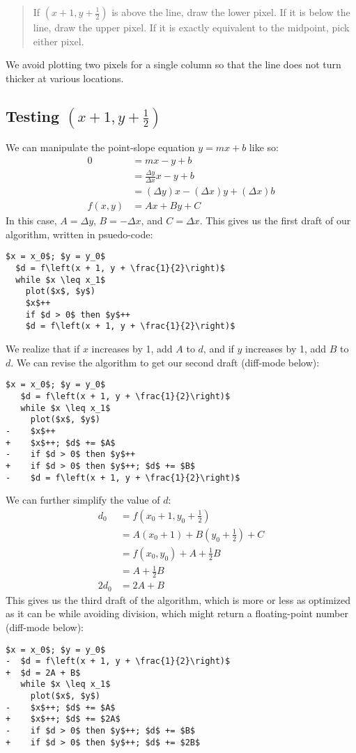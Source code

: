 \documentclass[12pt,letterpaper]{article}
\begin{document}
\begin{quote}
  If $\left(x + 1, y + \frac{1}{2}\right)$ is above the line, draw the lower pixel.
  If it is below the line, draw the upper pixel.
  If it is exactly equivalent to the midpoint, pick either pixel.
\end{quote}

We avoid plotting two pixels for a single column so that the line does not turn thicker at various locations.

\subsection{Testing $\left(x + 1, y + \frac{1}{2}\right)$}
We can manipulate the point-slope equation $y = mx + b$ like so:
\begin{align*}
  0       &= mx - y + b \\
          &= \frac{\Delta y}{\Delta x} x - y + b \\
          &= (\Delta y) x - (\Delta x) y + (\Delta x) b \\
  f(x, y) &= Ax + By + C
\end{align*}
In this case, $A = \Delta y$, $B = -\Delta x$, and $C = \Delta x$.
This gives us the first draft of our algorithm, written in psuedo-code:
\begin{lstlisting}[mathescape]
  $x = x_0$; $y = y_0$
  $d = f\left(x + 1, y + \frac{1}{2}\right)$
  while $x \leq x_1$
    plot($x$, $y$)
    $x$++
    if $d > 0$ then $y$++
    $d = f\left(x + 1, y + \frac{1}{2}\right)$
\end{lstlisting}
We realize that if $x$ increases by 1, add $A$ to $d$, and if $y$ increases by 1, add $B$ to $d$.
We can revise the algorithm to get our second draft (diff-mode below):
\begin{lstlisting}[mathescape]
   $x = x_0$; $y = y_0$
   $d = f\left(x + 1, y + \frac{1}{2}\right)$
   while $x \leq x_1$
     plot($x$, $y$)
-    $x$++
+    $x$++; $d$ += $A$
-    if $d > 0$ then $y$++
+    if $d > 0$ then $y$++; $d$ += $B$
-    $d = f\left(x + 1, y + \frac{1}{2}\right)$
\end{lstlisting}
We can further simplify the value of $d$:
\begin{align*}
  d_0   &= f\left(x_0 + 1, y_0 + \frac{1}{2}\right) \\
        &= A(x_0 + 1) + B\left(y_0 + \frac{1}{2}\right) + C \\
        &= f(x_0, y_0) + A + \frac{1}{2} B \\
        &= A + \frac{1}{2} B \\
  2 d_0 &= 2A + B
\end{align*}
This gives us the third draft of the algorithm, which is more or less as optimized as it can be while avoiding division, which might return a floating-point number (diff-mode below):
\begin{lstlisting}[mathescape]
   $x = x_0$; $y = y_0$
-  $d = f\left(x + 1, y + \frac{1}{2}\right)$
+  $d = 2A + B$
   while $x \leq x_1$
     plot($x$, $y$)
-    $x$++; $d$ += $A$
+    $x$++; $d$ += $2A$
-    if $d > 0$ then $y$++; $d$ += $B$
+    if $d > 0$ then $y$++; $d$ += $2B$
\end{lstlisting}
\end{document}

